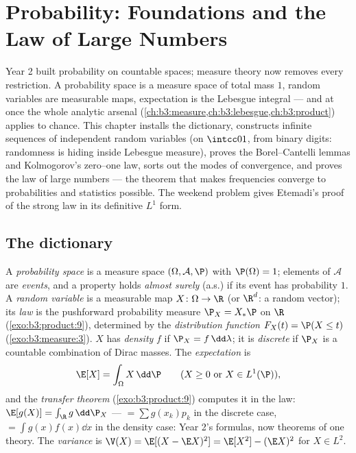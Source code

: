 \chapter{Probability: Foundations and the Law of Large
Numbers}\label{ch:b3:probability}

Year 2 built probability on countable spaces; measure theory
now removes every restriction. A probability space is a
measure space of total mass $1$, random variables are
measurable maps, expectation is the Lebesgue integral --- and
at once the whole analytic arsenal
(\cref{ch:b3:measure,ch:b3:lebesgue,ch:b3:product}) applies to
chance. This chapter installs the dictionary, constructs
infinite sequences of independent random variables (on
$\intcc01$, from binary digits: randomness is hiding inside
Lebesgue measure), proves the Borel--Cantelli lemmas and
Kolmogorov's zero--one law, sorts out the modes of
convergence, and proves the law of large numbers --- the
theorem that makes frequencies converge to probabilities and
statistics possible. The weekend problem gives Etemadi's proof
of the strong law in its definitive $L^1$ form.

\section{The dictionary}

\begin{definition}\label{def:b3:probability:space}
A \emph{probability space} is a
measure space $(\Omega, \mathcal A, \P)$ with $\P(\Omega) =
1$; elements of $\mathcal A$ are \emph{events}, and a property
holds \emph{almost surely} (a.s.) if its event has
probability $1$. A \emph{random variable} is a measurable map $X \colon \Omega \to \R$ (or
$\R^d$: a random vector); its \emph{law} is the pushforward probability measure $\P_X =
X_*\P$ on $\R$ (\cref{exo:b3:product:9}), determined by the
\emph{distribution function} $F_X(t) = \P(X \leq t)$
(\cref{exo:b3:measure:3}). $X$ has \emph{density} $f$ if
$\P_X = f\,\dd\lambda$; it is \emph{discrete} if $\P_X$ is a
countable combination of Dirac masses. The
\emph{expectation} is
\[
\E[X] = \int_\Omega X\,\dd\P
\qquad (X \geq 0 \text{ or } X \in L^1(\P)),
\]
and the \emph{transfer theorem} (\cref{exo:b3:product:9})
computes it in the law: $\E[g(X)] = \int_\R g\,\dd\P_X$ ---
$= \sum g(x_k)p_k$ in the discrete case, $= \int
g(x)f(x)\dd x$ in the density case: Year 2's formulas, now
theorems of one theory. The \emph{variance} is $\V(X) =
\E[(X - \E X)^2] = \E[X^2] - (\E X)^2$ for $X \in L^2$.
\end{definition}

